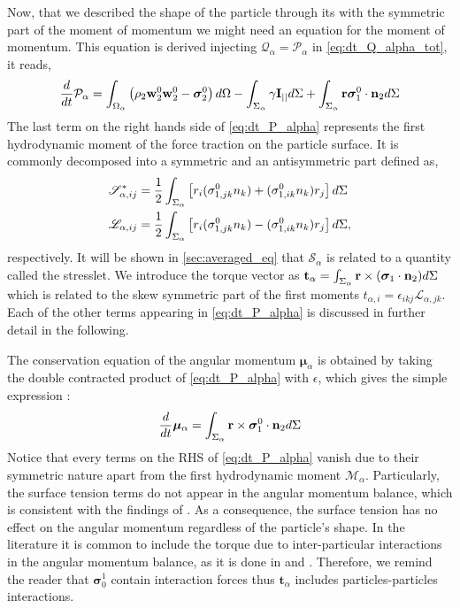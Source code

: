 Now, that we described the shape of the particle through its with the symmetric part of the moment of momentum we might need an equation for the moment of momentum. 
This equation is derived injecting $\mathcal{Q}_\alpha = \mathcal{P}_\alpha$ in \ref{eq:dt_Q_alpha_tot}, it reads, 
\begin{equation}
    \frac{d}{d t} {\mathcal{P}_\alpha}
    = \int_{\Omega_\alpha}  \left(
        \rho_2  \textbf{w}_2^0 \textbf{w}_2^0 
        - \bm{\sigma}_2^0
    \right)  d\Omega
    - \int_{\Sigma_\alpha}  
        \gamma \textbf{I}_{||}
     d\Sigma
    + \int_{\Sigma_\alpha}  \textbf{r}\bm{\sigma}_1^0\cdot \textbf{n}_2 d\Sigma 
    \label{eq:dt_P_alpha}
\end{equation}
The last term on the right hands side of \ref{eq:dt_P_alpha} represents the first hydrodynamic moment of the force traction on the particle surface.
It is commonly  decomposed into a symmetric and an antisymmetric part defined as, 
\begin{align}
    \label{eq:M_decomposition}
    \mathscr{S}_{\alpha,ij}^*
    &= \frac{1}{2}  \int_{\Sigma_\alpha}  \left[
        r_i(\sigma_{1,jk}^0 n_k)
        + (\sigma_{1,ik}^0 n_k)r_j
        \right] d\Sigma
    \\
    \mathscr{L}_{\alpha,ij}
    &= \frac{1}{2}  \int_{\Sigma_\alpha}  \left[
        r_i(\sigma_{1,jk}^0 n_k)
        - (\sigma_{1,ik}^0 n_k)r_j
    \right] d\Sigma, \nonumber
\end{align}
respectively. 
It will be shown in \ref{sec:averaged_eq} that $\mathscr{S}_\alpha$ is related to a quantity called the stresslet. 
We introduce the torque vector as $\textbf{t}_\alpha = \int_{\Sigma_\alpha}  \textbf{r} \times (\bm{\sigma}_1\cdot \textbf{n}_2)  d\Sigma$ which is related to the skew symmetric part of the first moments $t_{\alpha,i} = \epsilon_{ikj} \mathscr{L}_{\alpha,jk}$. 
Each of the other terms appearing in \ref{eq:dt_P_alpha} is discussed in further detail in the following.
 

The conservation equation of the angular momentum $\bm{\mu}_\alpha$ is obtained by taking the double contracted product of \ref{eq:dt_P_alpha} with $\epsilon$, which gives the simple expression :
\begin{equation}
    \frac{d}{d t}\bm{\mu}_\alpha
    =  
    \int_{\Sigma_\alpha}  \textbf{r} \times \bm{\sigma}_1^0\cdot \textbf{n}_2  d\Sigma
    \label{eq:dt_mu_alpha}
\end{equation}
Notice that every terms on the RHS of \ref{eq:dt_P_alpha} vanish due to their symmetric nature apart from the first hydrodynamic moment $\mathcal{M}_\alpha$.
Particularly, the surface tension terms do not appear in the angular momentum balance, which is consistent with the findings of \citet{hesla1993note}. 
As a consequence, the surface tension has no effect on the angular momentum regardless of the particle's shape. 
In the literature it is common to include the torque due to inter-particular interactions in the angular momentum balance, as it is done in \citet{jackson1997locally} and \citet{zhang1997momentum}.
Therefore, we remind the reader that $\bm{\sigma}_0^1$ contain interaction forces thus $\textbf{t}_\alpha$ includes particles-particles interactions.


